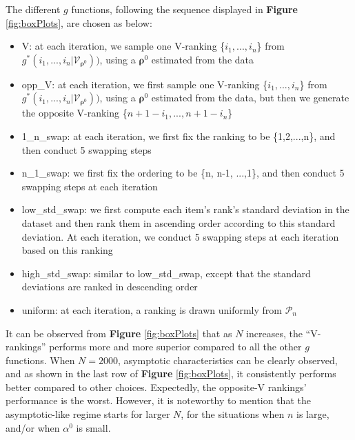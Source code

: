 \documentclass[11pt, oneside]{article}   	%
\begin{document}
The different $g$ functions, following the sequence displayed in \textbf{Figure} \ref{fig:boxPlots}, are chosen as below:
\begin{itemize}
	\item {V: at each iteration, we sample one V-ranking \{$i_1, ...,i_n$\} from $g^*(i_1, ..., i_n | \mathcal{V}_{\bm{\rho}^0}))$, using a $\bm{\rho}^0$ estimated from the data}
	\item {opp\_V: at each iteration, we first sample one V-ranking \{$i_1, ...,i_n$\} from $g^*(i_1, ..., i_n | \mathcal{V}_{\bm{\rho}^0}))$, using a $\bm{\rho}^0$ estimated from the data, but then we generate the opposite V-ranking \{$n+1 - i_1, ..., n+1 - i_n$\}}
	\item {1\_n\_swap: at each iteration, we first fix the ranking to be \{1,2,...,n\}, and then conduct 5 swapping steps}
	\item {n\_1\_swap: we first fix the ordering to be \{n, n-1, ...,1\}, and then conduct 5 swapping steps at each iteration}
	\item {low\_std\_swap: we first compute each item's rank's standard deviation in the dataset and then rank them in ascending order according to this standard deviation. At each iteration, we conduct 5 swapping steps at each iteration based on this ranking }
	\item {high\_std\_swap: similar to low\_std\_swap, except that the standard deviations are ranked in descending order}
	\item{uniform: at each iteration, a ranking is drawn uniformly from $\mathcal{P}_n$}
\end{itemize}

It can be observed from \textbf{Figure} \ref{fig:boxPlots} that as $N$ increases, the ``V-rankings'' performs more and more superior compared to all the other $g$ functions. When $N = 2000$, asymptotic characteristics can be clearly observed, and as shown in the last row of \textbf{Figure} \ref{fig:boxPlots}, it consistently performs better compared to other choices. Expectedly, the opposite-V rankings' performance is the worst. However, it is noteworthy to mention that the asymptotic-like  regime starts for larger $N$, for the situations when $n$ is large, and/or when $\alpha^0$ is small.%
\end{document}
